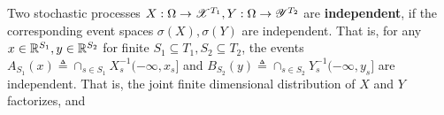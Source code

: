 \documentclass[letterpaper,10pt,english]{article}
\begin{document}
\begin{defn}
Two stochastic processes $X: \Omega \to \mathscr{X}^{T_1},Y:\Omega\to \mathscr{Y}^{T_2}$ are \textbf{independent}, if the corresponding event spaces $\sigma(X), \sigma(Y)$ are independent. 
That is, for any $x \in \mathbb{R}^{S_1}, y \in \mathbb{R}^{S_2}$ for finite $S_1 \subseteq T_1, S_2\subseteq T_2$, 
the events $A_{S_1}(x) \triangleq \cap_{s\in S_1}X_s^{-1}(-\infty, x_s]$ and $B_{S_2}(y) \triangleq \cap_{s \in S_2}Y_s^{-1}(-\infty, y_s]$ are independent. 
That is, the joint finite dimensional distribution of $X$ and $Y$ factorizes, and 
\end{defn}
 
\end{document}
